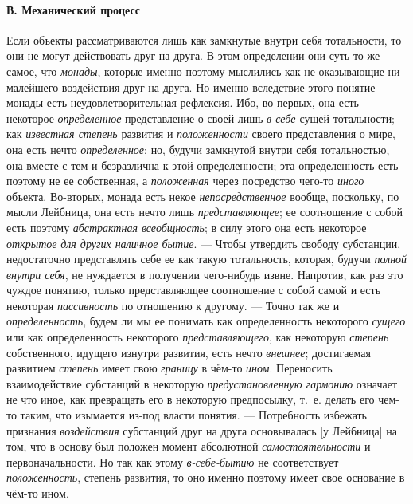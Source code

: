 \documentclass[twoside]{article}
\begin{document}
{{{{{{\paragraph[В. Механический процесс]{В. Механический процесс}
Если объекты рассматриваются лишь как замкнутые внутри себя
тотальности, то они не могут действовать друг на друга. В этом определении
они суть то же самое, что {\em монады},
которые именно поэтому мыслились как не оказывающие ни
малейшего воздействия друг на друга. Но именно вследствие этого понятие
монады есть неудовлетворительная рефлексия. Ибо, во-первых, она есть
некоторое {\em определенное}
представление о своей лишь
{\em в-себе-}сущей
тотальности; как {\em известная
степень} развития и
{\em положенности} своего
представления о мире, она есть нечто
{\em определенное}; но,
будучи замкнутой внутри себя тотальностью, она вместе с тем и безразлична к
этой определенности; эта определенность есть поэтому не ее собственная, а
{\em положенная} через
посредство чего-то {\em иного}
объекта. Во-вторых, монада есть некое
{\em непосредственное}
вообще, поскольку, по мысли Лейбница, она есть нечто лишь
{\em представляющее}; ее
соотношение с собой есть поэтому
{\em абстрактная всеобщность};
в силу этого она есть некоторое
{\em открытое}
{\em для других наличное бытие}. —
Чтобы утвердить свободу субстанции, недостаточно представлять
себе ее как такую тотальность, которая, будучи
{\em полной внутри себя},
не нуждается в получении чего-нибудь извне. Напротив, как раз
это чуждое понятию, только представляющее соотношение с собой самой и есть
некоторая {\em пассивность}
по отношению к другому. — Точно так же и
{\em определенность},
будем ли мы ее понимать как определенность некоторого
{\em сущего} или как
определенность некоторого
{\em представляющего},
как некоторую
{\em степень}
собственного, идущего изнутри развития, есть нечто
{\em внешнее};
достигаемая развитием
{\em степень} имеет свою
{\em границу} в чём-то
{\em ином}. Переносить
взаимодействие субстанций в некоторую
{\em предустановленную гармонию}
означает не что иное, как превращать его в некоторую
предпосылку, т.~е. делать его чем-то таким, что изымается из-под власти
понятия. — Потребность избежать признания
{\em воздействия}
субстанций друг на друга основывалась [у Лейбница] на том,
что в основу был положен момент абсолютной
{\em самостоятельности} и
первоначальности. Но так как этому
{\em в-себе-бытию} не
соответствует {\em положенность},
степень развития, то оно именно поэтому имеет свое основание
в чём-то ином.

}}}}}}
\end{document}
